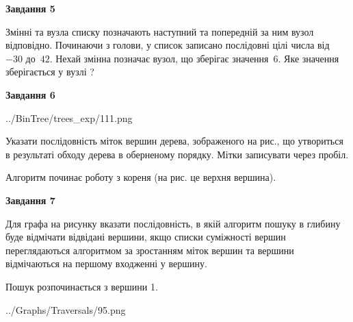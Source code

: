 \documentclass[12pt, ukrainian]{article}
\begin{document}
{\begin {large}
{\begin {center}\textbf{Завдання 5}\end {center}}\par
Змінні  та  вузла списку позначають наступний та попередній за ним вузол відповідно. Починаючи з голови, у список записано послідовні цілі числа від~$-30$ до~$42$. Нехай змінна  позначає вузол, що зберігає значення~$6$.
Яке значення зберігається у вузлі  ?\par
\newpage

{\begin {center}\textbf{Завдання 6}\end {center}}\par

\begin{center}
	{../BinTree/trees_exp/111.png}
\end{center}
Указати послідовність міток вершин дерева, зображеного на рис., що утвориться в результаті обходу дерева в оберненому порядку. Мітки записувати через пробіл.\par Алгоритм починає роботу з кореня (на рис. це верхня вершина).\par
\newpage

{\begin {center}\textbf{Завдання 7}\end {center}}\par
Для графа на рисунку вказати послідовність, в якій алгоритм пошуку в глибину буде відмічати відвідані вершини, якщо списки суміжності вершин переглядаються алгоритмом за зростанням міток вершин та вершини відмічаються на першому вход\-женні у вершину.\par
Пошук розпочинається з вершини 1.\par

\begin{center}
	{../Graphs/Traversals/95.png}
\end{center}\par
\newpage


\end{large}}
\end{document}
